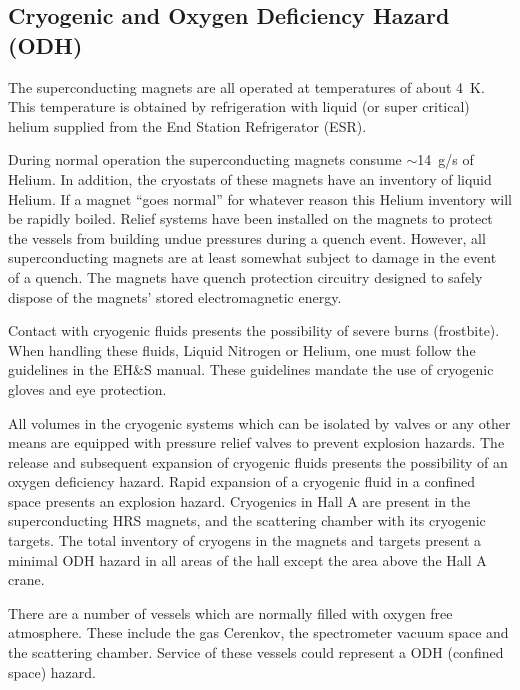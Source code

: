 \begin{safetyen}{0}{0}
\section{Cryogenic and Oxygen Deficiency Hazard (ODH)} 
\label{sec:odhhazard}
\end{safetyen}

The superconducting magnets are all operated at temperatures of about 4~K. 
This temperature is obtained by refrigeration with liquid (or super critical) 
helium supplied from the End Station Refrigerator (ESR).

During normal operation the superconducting magnets consume $\sim$14~g/s of Helium. 
In addition, the cryostats of these magnets have an inventory of liquid Helium. If a magnet ``goes
normal'' for whatever reason this Helium inventory will be rapidly boiled. Relief systems have been 
installed on the magnets to protect the vessels from building undue pressures during a quench event. 
However, all superconducting magnets are at least somewhat subject to damage in the event of a quench. 
The magnets have quench protection circuitry designed to safely dispose of the magnets' 
stored electromagnetic energy.

Contact with cryogenic fluids presents the possibility of severe burns (frostbite). 
When handling these fluids, Liquid Nitrogen or Helium, one must follow the
guidelines in the EH\&S manual\cite{EHScebaf}. These guidelines mandate the use 
of cryogenic gloves and eye protection.

All volumes in the cryogenic systems which can be isolated by valves or any other 
means are equipped with pressure relief valves to prevent explosion hazards.
The release and subsequent expansion of cryogenic fluids presents the possibility 
of an oxygen deficiency hazard. Rapid expansion of a cryogenic fluid in a confined 
space presents an explosion hazard. Cryogenics in Hall A are present in the superconducting 
HRS magnets, and the scattering chamber with its cryogenic targets. The total 
inventory of cryogens in the magnets and targets present a minimal ODH hazard in all 
areas of the hall except the area above the Hall A crane.

There are a number of vessels which are normally filled with oxygen free atmosphere. 
These include the gas Cerenkov, the spectrometer vacuum space and the scattering chamber. 
Service of these vessels could represent a ODH (confined space) hazard.

